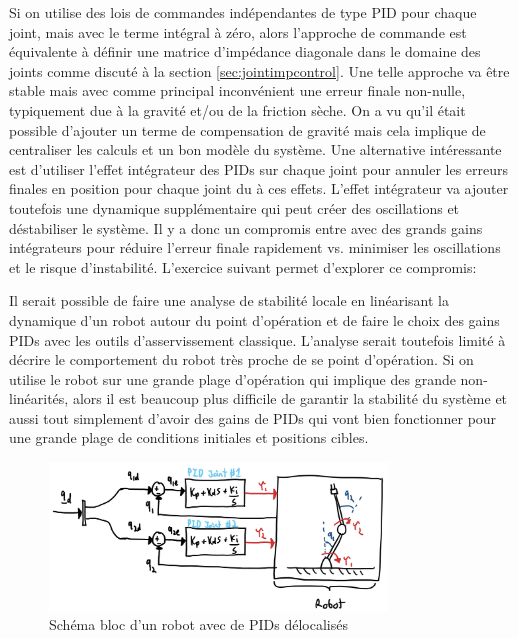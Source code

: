 Si on utilise des lois de commandes indépendantes de type PID pour chaque joint, mais avec le terme intégral à zéro, alors l'approche de commande est équivalente à définir une matrice d'impédance diagonale dans le domaine des joints comme discuté à la section \ref{sec:jointimpcontrol}. Une telle approche va être stable mais avec comme principal inconvénient une erreur finale non-nulle, typiquement due à la gravité et/ou de la friction sèche. On a vu qu'il était possible d'ajouter un terme de compensation de gravité mais cela implique de centraliser les calculs et un bon modèle du système. Une alternative intéressante est d'utiliser l'effet intégrateur des PIDs sur chaque joint pour annuler les erreurs finales en position pour chaque joint du à ces effets. L'effet intégrateur va ajouter toutefois une dynamique supplémentaire qui peut créer des oscillations et déstabiliser le système. Il y a donc un compromis entre avec des grands gains intégrateurs pour réduire l'erreur finale rapidement vs. minimiser les oscillations et le risque d'instabilité. L'exercice suivant permet d'explorer ce compromis:


Il serait possible de faire une analyse de stabilité locale en linéarisant la dynamique d'un robot autour du point d'opération et de faire le choix des gains PIDs avec les outils d'asservissement classique. L'analyse serait toutefois limité à décrire le comportement du robot très proche de se point d'opération. Si on utilise le robot sur une grande plage d'opération qui implique des grande non-linéarités, alors il est beaucoup plus difficile de garantir la stabilité du système et aussi tout simplement d'avoir des gains de PIDs qui vont bien fonctionner pour une grande plage de conditions initiales et positions cibles. 

\begin{figure}[ht]
	\centering
		\includegraphics[width=0.80\textwidth]{fig/jointpids.jpg}
	\caption{Schéma bloc d'un robot avec de PIDs délocalisés}
	\label{fig:jointpids}
\end{figure}


